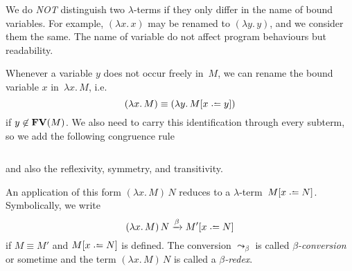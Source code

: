 \begin{convention}
  We do \emph{NOT} distinguish two $\lambda$-terms if they only differ in the
  name of bound variables. For example, $(\lambda x.\, x)$ may be renamed to 
  $(\lambda y.\, y)$, and we consider them the same. The name of variable do not
  affect program behaviours but readability.
\end{convention}
\begin{definition}
  Whenever a variable $y$ does not occur freely in~$M$, we can rename the bound
  variable $x$ in~$\lambda x.\, M$, i.e.\ 
  \[
    (\lambda x.\, M) \equiv (\lambda y.\, M\subst{x}{y})
  \]
  if $y \not\in \mathbf{FV}(M)$. We also need to carry this identification through every
  subterm, so we add the following congruence rule
  \begin{columns}
    \begin{prooftree}
    \end{prooftree}
    \begin{prooftree}
    \end{prooftree}
  \end{columns}
  and also the reflexivity, symmetry, and transitivity.
\end{definition}
\begin{definition}
  An application of this form $(\lambda x.\, M)\, N$ reduces to a
  $\lambda$-term~$M\subst{x}{N}$. Symbolically, we write 
  \[
    (\lambda x.\, M)\, N \xrightarrow{\beta} M'\subst{x}{N}
  \]
  if $M\equiv M'$ and $M\subst{x}{N}$ is defined.
  The conversion $\leadsto_\beta$ is called \emph{$\beta$-conversion} or
  sometime and the term $(\lambda x.\, M)\, N$ is
  called a \emph{$\beta$-redex}.
\end{definition}

